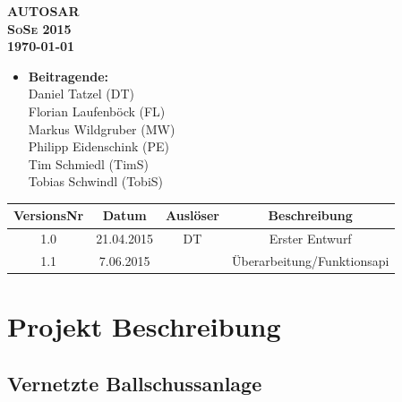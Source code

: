 \documentclass[a4paper,11pt]{scrreprt}
\begin{document}
\begin{titlepage}

\vspace*{\fill}
  \begin{center}

\huge \bfseries AUTOSAR \\[2.5cm]

\textsc{\Large SoSe 2015}\\[0.5cm]

\large \today

\vfill

  \end{center}
\end{titlepage}

\begin{itemize}
\item[] \textbf{\large Beitragende:}\\
Daniel Tatzel (DT)\\
Florian Laufenböck (FL)\\
Markus Wildgruber (MW)\\
Philipp Eidenschink (PE)\\
Tim Schmiedl (TimS)\\
Tobias Schwindl (TobiS)
\end{itemize}

\bigskip

\begin{table}[!h]
 	\centering
	\begin{tabular}{|c|c|c|c|}
	\hline
	\textbf{VersionsNr} &  \textbf{Datum} & \textbf{Auslöser} & \textbf{Beschreibung} \\
	\hline
	1.0 & 21.04.2015 & DT & Erster Entwurf \\
	1.1 & 7.06.2015 & & Überarbeitung/Funktionsapi\\
	\hline
	\end{tabular}

\end{table}



\chapter{Projekt Beschreibung}

\section{Vernetzte Ballschussanlage}
\end{document}
